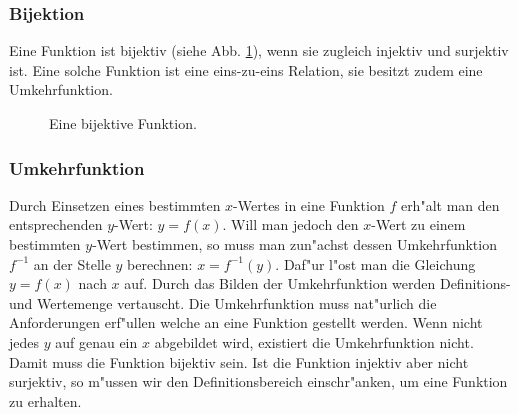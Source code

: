 \subsubsection{Bijektion}
Eine Funktion ist bijektiv (siehe Abb. \ref{fig:bijectiv}), wenn sie zugleich injektiv und surjektiv ist. Eine solche Funktion ist eine eins-zu-eins Relation, sie besitzt zudem eine Umkehrfunktion.
\begin{figure}[h!]
 \centering
 \caption{Eine bijektive Funktion.}
 \label{fig:bijectiv}
\end{figure}

\subsubsection{Umkehrfunktion}
Durch Einsetzen eines bestimmten $x$-Wertes in eine Funktion $f$ erh"alt man den entsprechenden $y$-Wert: $y=f(x)$. Will man jedoch den $x$-Wert zu einem bestimmten $y$-Wert bestimmen, so muss man zun"achst dessen Umkehrfunktion $f^{-1}$ an der Stelle $y$ berechnen: $x=f^{-1}(y)$. Daf"ur l"ost man die Gleichung $y=f(x)$ nach $x$ auf. Durch das Bilden der Umkehrfunktion werden Definitions- und Wertemenge vertauscht. Die Umkehrfunktion muss nat"urlich die Anforderungen erf"ullen welche an eine Funktion gestellt werden. Wenn nicht jedes $y$ auf genau ein $x$ abgebildet wird, existiert die Umkehrfunktion nicht. Damit muss die Funktion bijektiv sein. Ist die Funktion injektiv aber nicht surjektiv, so m"ussen wir den Definitionsbereich einschr"anken, um eine Funktion zu erhalten. 

